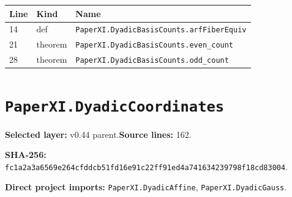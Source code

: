 \documentclass[10pt,oneside]{book}
\begin{document}
\begin{longtable}{@{}p{}p{}p{}@{}}\toprule Line&Kind&Name\\\midrule\endhead

14&def&\nolinkurl{PaperXI.DyadicBasisCounts.arfFiberEquiv}\\

21&theorem&\nolinkurl{PaperXI.DyadicBasisCounts.even_count}\\

28&theorem&\nolinkurl{PaperXI.DyadicBasisCounts.odd_count}\\

\bottomrule\end{longtable}

\section{\texorpdfstring{\nolinkurl{PaperXI.DyadicCoordinates}}{PaperXI.DyadicCoordinates}}\label{module:PaperXI.DyadicCoordinates}

\textbf{Selected layer:} v0.44 parent.\quad\textbf{Source lines:} 162.\par\textbf{SHA-256:} {\scriptsize\nolinkurl{fc1a2a3a6569e264cfddcb51fd16e91c22ff91ed4a741634239798f18cd83004}}.


\textbf{Direct project imports:} \nolinkurl{PaperXI.DyadicAffine}, \nolinkurl{PaperXI.DyadicGauss}.
\end{document}

